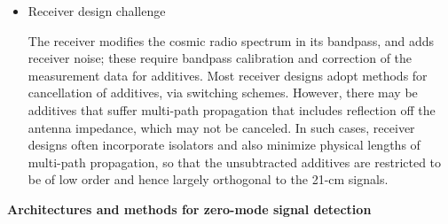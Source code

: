 \begin{itemize}
\item 
Receiver design challenge

The receiver modifies the cosmic radio spectrum in its bandpass, and adds receiver noise; these require bandpass calibration and correction of the measurement data for additives.  Most receiver designs adopt methods for cancellation of additives, via switching schemes.  However, there may be additives that suffer multi-path propagation that includes reflection off the antenna impedance, which may not be canceled.  In such cases, receiver designs often incorporate isolators and also minimize physical lengths of multi-path propagation, so that the unsubtracted additives are restricted to be of low order and hence largely orthogonal to the 21-cm signals.

\end{itemize}

\textbf{Architectures and methods for zero-mode signal detection}

